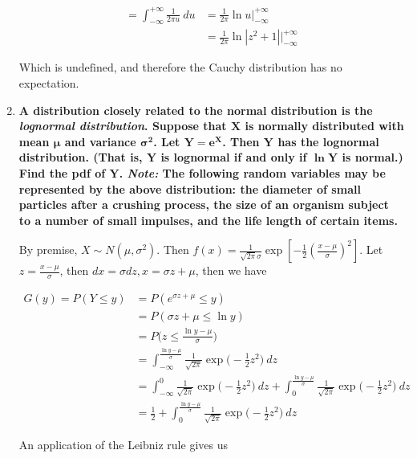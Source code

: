 \documentclass[10pt, oneside]{article}   	%
\theoremstyle{definition}
\begin{document}
\begin{enumerate}[label=9.\arabic*]
\begin{align*}
= \int^{+\infty}_{-\infty} \frac{1}{2 \pi u} \ du &= \frac{1}{2 \pi} \ln u \bigg|^{+\infty}_{-\infty} \\
&= \frac{1}{2 \pi} \ln |z^2 + 1| \bigg|^{+\infty}_{-\infty}
\end{align*}

Which is $\boxed{ \text{undefined}}$, and therefore the Cauchy distribution has no expectation.

\item  \begin{tcolorbox}[
  colback=Cerulean!5!white,
  colframe=Cerulean!75!black]
\textbf{A distribution closely related to the normal distribution is the \textit{lognormal distribution}. Suppose that $\bm{X}$ is normally distributed with mean $\bm{\mu}$ and variance $\bm{\sigma^2}$. Let $\bm{Y = e^X}$. Then $\bm{Y}$ has the lognormal distribution. (That is, $\bm{Y}$ is lognormal if and only if $\bm{\ln Y}$ is normal.) Find the pdf of $\bm{Y}$. \textit{Note:} The following random variables may be represented by the above distribution: the diameter of small particles after a crushing process, the size of an organism subject to a number of small impulses, and the life length of certain items.}
\end{tcolorbox}

By premise, $X \sim N(\mu, \sigma^2)$. Then $f(x) = \frac{1}{\sqrt{2 \pi} \sigma} \exp [-\frac{1}{2} (\frac{x - \mu}{\sigma})^2]$. Let $z = \frac{x - \mu}{\sigma}$, then $dx = \sigma dz, x = \sigma z + \mu$, then we have

\begin{align*}
G(y) = P(Y \leq y) &= P(e^{\sigma z + \mu} \leq y) \\
&= P(\sigma z + \mu \leq \ln y) \\
&= P\bigg( z \leq \frac{\ln y - \mu}{\sigma} \bigg) \\
&= \int^{\frac{\ln y - \mu}{\sigma}}_{-\infty} \frac{1}{\sqrt{2\pi}} \exp \bigg( -\frac{1}{2} z^2 \bigg) \ dz \\
&= \int^{0}_{-\infty} \frac{1}{\sqrt{2\pi}} \exp \bigg( -\frac{1}{2} z^2 \bigg) \ dz + \int^{\frac{\ln y - \mu}{\sigma}}_{0} \frac{1}{\sqrt{2\pi}} \exp \bigg( -\frac{1}{2} z^2 \bigg) \ dz \\
&= \frac{1}{2} + \int^{\frac{\ln y - \mu}{\sigma}}_{0} \frac{1}{\sqrt{2\pi}} \exp \bigg( -\frac{1}{2} z^2 \bigg) \ dz
\end{align*}

An application of the Leibniz rule gives us


\end{enumerate}
\end{document}
